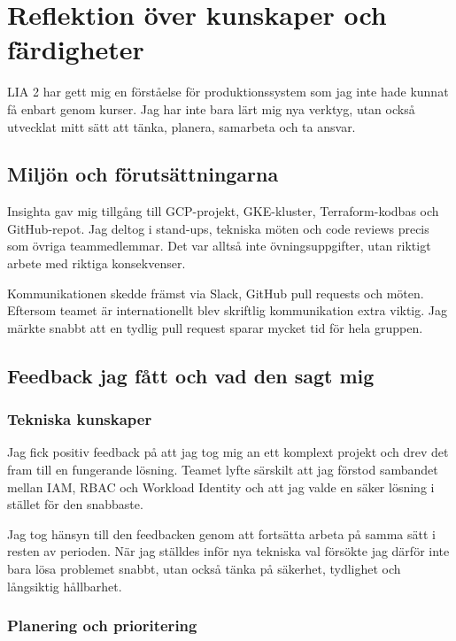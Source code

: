 
\section{Reflektion över kunskaper och färdigheter}
\label{sec:reflektion}

LIA 2 har gett mig en förståelse för produktionssystem som jag inte hade kunnat få enbart genom
kurser. Jag har inte bara lärt mig nya verktyg, utan också utvecklat mitt sätt att tänka,
planera, samarbeta och ta ansvar.

\subsection*{Miljön och förutsättningarna}

Insighta gav mig tillgång till GCP-projekt, GKE-kluster, Terraform-kodbas och GitHub-repot.
Jag deltog i stand-ups, tekniska möten och code reviews precis som övriga teammedlemmar.
Det var alltså inte övningsuppgifter, utan riktigt arbete med riktiga konsekvenser.

Kommunikationen skedde främst via Slack, GitHub pull requests och möten. Eftersom teamet är
internationellt blev skriftlig kommunikation extra viktig. Jag märkte snabbt att en tydlig pull
request sparar mycket tid för hela gruppen.

\subsection{Feedback jag fått och vad den sagt mig}
\label{subsec:feedback}

\subsubsection{Tekniska kunskaper}
\label{subsubsec:kunskaper_feedback}

Jag fick positiv feedback på att jag tog mig an ett komplext projekt och drev det fram till en
fungerande lösning. Teamet lyfte särskilt att jag förstod sambandet mellan IAM, RBAC och
Workload Identity och att jag valde en säker lösning i stället för den snabbaste.

Jag tog hänsyn till den feedbacken genom att fortsätta arbeta på samma sätt i resten av
perioden. När jag ställdes inför nya tekniska val försökte jag därför inte bara lösa problemet
snabbt, utan också tänka på säkerhet, tydlighet och långsiktig hållbarhet.

\subsubsection{Planering och prioritering}
\label{subsubsec:omdome_feedback}

